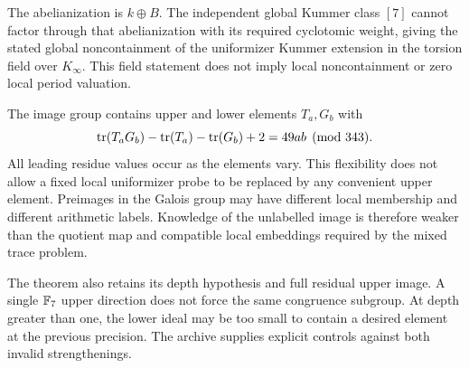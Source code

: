 The abelianization is $k\oplus B$. The independent global Kummer class $[7]$ cannot factor through that abelianization with its required cyclotomic weight, giving the stated global noncontainment of the uniformizer Kummer extension in the torsion field over $K_\infty$. This field statement does not imply local noncontainment or zero local period valuation.

The image group contains upper and lower elements $T_a,G_b$ with
\[
\operatorname{tr}(T_aG_b)-\operatorname{tr}(T_a)-\operatorname{tr}(G_b)+2=49ab\pmod{343}.
\]
All leading residue values occur as the elements vary. This flexibility does not allow a fixed local uniformizer probe to be replaced by any convenient upper element. Preimages in the Galois group may have different local membership and different arithmetic labels. Knowledge of the unlabelled image is therefore weaker than the quotient map and compatible local embeddings required by the mixed trace problem.

The theorem also retains its depth hypothesis and full residual upper image. A single $\mathbb F_7$ upper direction does not force the same congruence subgroup. At depth greater than one, the lower ideal may be too small to contain a desired element at the previous precision. The archive supplies explicit controls against both invalid strengthenings.
